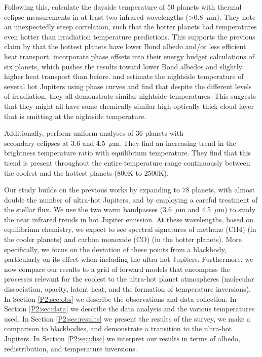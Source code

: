 Following this, \citet{Schwartz2015} calculate the dayside temperature of 50 planets with thermal eclipse measurements in at least two infrared wavelengths (>0.8~$\mu$m). They note an unexpectedly steep correlation, such that the hotter planets had temperatures even hotter than irradiation temperature predictions. This supports the previous claim by \citet{Cowan2011b} that the hottest planets have lower Bond albedo and/or less efficient heat transport.
\citet{Schwartz2017} incorporate phase offsets into their energy budget calculations of six planets, which pushes the results toward lower Bond albedos and slightly higher heat transport than before. \citet{Keating2019} and \citet{Beatty2019} estimate the nightside temperature of several hot Jupiters using \spitzer phase curves and find that despite the different levels of irradiation, they all demonstrate similar nightside temperatures. This suggests that they might all have some chemically similar high optically thick cloud layer that is emitting at the nightside temperature.

Additionally, \citet{Garhart2020} perform  uniform analyses of 36 planets with \\
\spitzerIRAC secondary eclipses at 3.6 and 4.5~$\mu$m. They find an increasing trend in the brightness temperature ratio with equilibrium temperature. They find that this trend is present throughout the entire temperature range continuously between the coolest and the hottest planets (800K to 2500K).

Our study builds on the previous works by expanding to 78 planets, with almost double the number of ultra-hot Jupiters, and by employing a careful treatment of the stellar flux. We use the two warm \spitzerIRAC bandpasses (3.6~$\mu$m and 4.5~$\mu$m) \citep{Fazio2004, Werner2004} to study the near infrared trends in hot Jupiter emission. At these wavelengths, based on equilibrium chemistry, we expect to see spectral signatures of methane (CH4) (in the cooler planets) and carbon monoxide (CO) (in the hotter planets).
More specifically, we focus on the deviation of these points from a blackbody, particularly on its effect when including the ultra-hot Jupiters. Furthermore, we now compare our results to a grid of forward models that encompass the processes relevant for the coolest to the ultra-hot planet atmospheres (molecular dissociation,  opacity, latent heat, and the formation of temperature inversions). In Section \ref{P2:sec:obs} we describe the \spitzerIRAC observations and data collection. In Section \ref{P2:sec:data} we describe the data analysis and the various temperatures used. In Section \ref{P2:sec:results} we present the results of the survey, we make a comparison to blackbodies, and demonstrate a transition to the ultra-hot Jupiters. In Section \ref{P2:sec:disc} we interpret our results in terms of albedo, redistribution, and temperature inversions.

